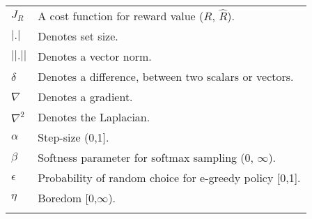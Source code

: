 \begin{table}[]
\begin{tabular}{ll}
    $J_R$ & A cost function for reward value ($R$, $\hat R$). \\
    $|.|$ & Denotes set size. \\
    $||.||$ & Denotes a vector norm. \\
    $\delta$ & Denotes a difference, between two scalars or vectors. \\
    $\nabla$ & Denotes a gradient. \\
    $\nabla^2$ & Denotes the Laplacian. \\
    $\alpha$ & Step-size (0,1]. \\
    $\beta$ & Softness parameter for softmax sampling (0, $\infty$). \\
    $\epsilon$ & Probability of random choice for e-greedy policy [0,1]. \\
    $\eta$ & Boredom [0,$\infty$). \\
    &                          
    \end{tabular}
\end{table}
 